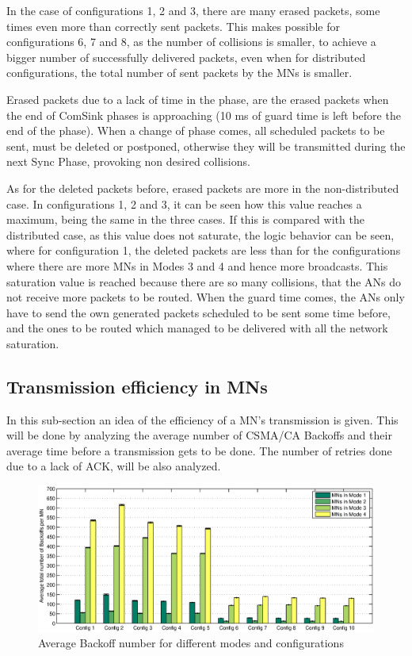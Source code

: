In the case of configurations 1, 2 and 3, there are many erased packets, some times even more than correctly sent packets. This makes possible 
for configurations 6, 7 and 8, as the number of collisions is smaller, to achieve a bigger number of successfully delivered packets, even 
when for distributed configurations, the total number of sent packets by the \acp{MN} is smaller.

Erased packets due to a lack of time in the phase, are the erased packets when the end of ComSink phases is approaching (10 ms of guard time is left
before the end of the phase). When a change of phase comes, all scheduled packets to be sent, must be deleted or postponed, otherwise they will be 
transmitted during the next Sync Phase, provoking non desired collisions.

As for the deleted packets before, erased packets are more in the non-distributed case. In configurations 1, 2 and 3, it can be seen how this value
reaches a maximum, being the same in the three cases. If this is compared with the distributed case, as this value does not saturate, the logic behavior 
can be seen, where for configuration 1, the deleted packets are less than for the configurations where there are more \acp{MN} in Modes 3 and 4 and hence 
more broadcasts. This saturation value is reached because there are so many collisions, that the \acp{AN} do not receive more packets to be routed.
When the guard time comes, the \acp{AN} only have to send the own generated packets scheduled to be sent some time before, and the ones to be routed 
which managed to be delivered with all the network saturation.

\subsection{Transmission efficiency in \acp{MN}}

In this sub-section an idea of the efficiency of a \ac{MN}'s transmission is given. This will be done by analyzing the average number of \ac{CSMA/CA}
Backoffs and their average time before a transmission gets to be done. The number of retries done due to a lack of \ac{ACK}, will be also analyzed.

\begin{figure}[ht]
 \begin{center}
  \includegraphics[width=1\textwidth]{BackoffNumberInMN.eps}
 \end{center}
 \caption{Average Backoff number for different modes and configurations}
 \label{fig:BackoffNumberInMN}
\end{figure}

